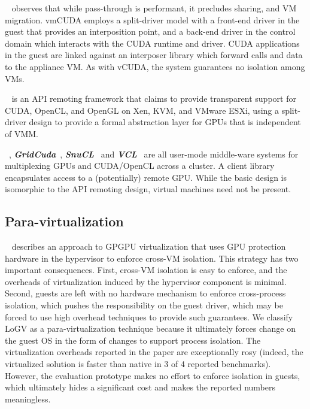~\cite{vmCUDA} observes that while pass-through is
performant, it precludes sharing, and VM migration.
vmCUDA employs a split-driver model with a front-end driver in the guest that
provides an interposition point, and a back-end driver in the control domain
which interacts with the CUDA runtime and driver. CUDA applications in the
guest are linked against an interposer library which forward calls and data to
the appliance VM. As with vCUDA, the system guarantees no isolation among VMs.

~\cite{gVirtuS} is an API remoting framework that claims
to provide transparent support for CUDA, OpenCL, and OpenGL on Xen, KVM, and
VMware ESXi, using a split-driver design to provide a formal abstraction layer
for GPUs that is independent of VMM.

~\cite{rCUDA, rCUDAnew},
\textbf{\textit{GridCuda}}~\cite{GridCuda},
\textbf{\textit{SnuCL}}~\cite{kim2012snucl} and
\textbf{\textit{VCL}}~\cite{VCL} are all user-mode middle-ware systems for
multiplexing GPUs and CUDA/OpenCL across a cluster. A client library
encapsulates access to a (potentially) remote GPU. While the basic design is
isomorphic to the API remoting design, virtual machines need not be present.

\subsection{Para-virtualization}

~\cite{logv} describes an approach to GPGPU virtualization
that uses GPU protection hardware in the hypervisor to enforce cross-VM
isolation. This strategy has two important consequences. First, cross-VM
isolation is easy to enforce, and the overheads of virtualization induced by
the hypervisor component is minimal. Second, guests are left with no hardware
mechanism to enforce cross-process isolation, which pushes the responsibility
on the guest driver, which may be forced to use high overhead techniques to
provide such guarantees. We classify LoGV as a para-virtualization technique
because it ultimately forces change on the guest OS in the form of changes to
support process isolation. The virtualization overheads reported in the paper
are exceptionally rosy (indeed, the virtualized solution is faster than native
in 3 of 4 reported benchmarks). However, the evaluation prototype makes no
effort to enforce isolation in guests, which ultimately hides a significant
cost and makes the reported numbers meaningless.

